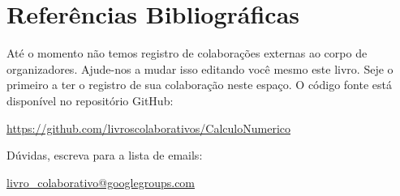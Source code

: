 \documentclass[12pt,a4paper]{book}
\begin{document}
\nocite{*}


\begingroup
\chapter*{Referências Bibliográficas}
\renewcommand{\chapter}[2]{}

\endgroup

\begingroup
\chapter*{Colaboradores}
\renewcommand{\chapter}[2]{}
Até o momento não temos registro de colaborações externas ao corpo de organizadores. Ajude-nos a mudar isso editando você mesmo este livro. Seje o primeiro a ter o registro de sua colaboração neste espaço. O código fonte está disponível no repositório GitHub:
\begin{center}
  \url{https://github.com/livroscolaborativos/CalculoNumerico}
\end{center}
Dúvidas, escreva para a lista de emails:
\begin{center}
  \url{livro_colaborativo@googlegroups.com}
\end{center}
\endgroup


\clearpage
{}
\printindex
\end{document}
